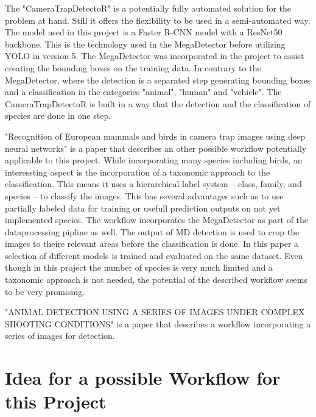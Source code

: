 \documentclass{article}
\begin{document}
The "CameraTrapDetectoR" \autocite{tabakCameraTrapDetectoRAutomaticallyDetect2022} is a potentially fully automated solution for the problem at hand.
Still it offers the flexibility to be used in a semi-automated way. The model used in this project is a Faster R-CNN model with a ResNet50 backbone.
This is the technology used in the MegaDetector before utilizing YOLO in version 5. The MegaDetector was incorporated in the project to
assist creating the bounding boxes on the training data. In contrary to the MegaDetector, where the detection is a separated step generating
bounding boxes and a classification in the categories "animal", "human" and "vehicle". The CameraTrapDetectoR is built in a way that 
the detection and the classification of species are done in one step.\par
\vspace{10pt}

"Recognition of European mammals and birds in camera trap  images using deep neural networks" \autocite{schneiderRecognitionEuropeanMammals2024}
is a paper that describes an other possible workflow potentially applicable to this project. While incorporating many species including birds,
an interessting aspect is the incorporation of a taxonomic approach to the classification.
This means it uses a hierarchical label system -- class, family, and species -- to classify the images. This has several advantages such as
to use partially labeled data for training or usefull prediction outputs on not yet implemented species.
The workflow incorporates the MegaDetector as part of the dataprocessing pipline as well. The output of MD detection is used to crop the images
to theire relevant areas before the classification is done. In this paper a selection of different models is trained and evaluated on the same
dataset. Even though in this project the number of species is very much limited and a taxonomic approach is not needed, the potential of
the described workflow seems to be very promising.\par
\vspace{10pt}

"ANIMAL DETECTION USING A SERIES OF IMAGES UNDER COMPLEX SHOOTING CONDITIONS" \autocite{zotinANIMALDETECTIONUSING2019} is a paper
that describes a workflow incorporating a series of images for detection.




\section*{Idea for a possible Workflow for this Project}
\end{document}
